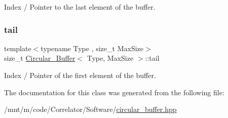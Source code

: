 Index / Pointer to the last element of the buffer. 

\mbox{\label{classCircular__Buffer_a6eb4d6b77a513a6b9bd8465197e48ad4}} 
\subsubsection{\texorpdfstring{tail}{tail}}
{\footnotesize\ttfamily template$<$typename Type , size\+\_\+t Max\+Size$>$ \\
size\+\_\+t \hyperlink{classCircular__Buffer}{Circular\+\_\+\+Buffer}$<$ Type, Max\+Size $>$\+::tail\hspace{0.3cm}{\ttfamily [private]}}



Index / Pointer of the first element of the buffer. 



The documentation for this class was generated from the following file\+:\begin{DoxyCompactItemize}
\item 
/mnt/m/code/\+Correlator/\+Software/\hyperlink{circular__buffer_8hpp}{circular\+\_\+buffer.\+hpp}\end{DoxyCompactItemize}
